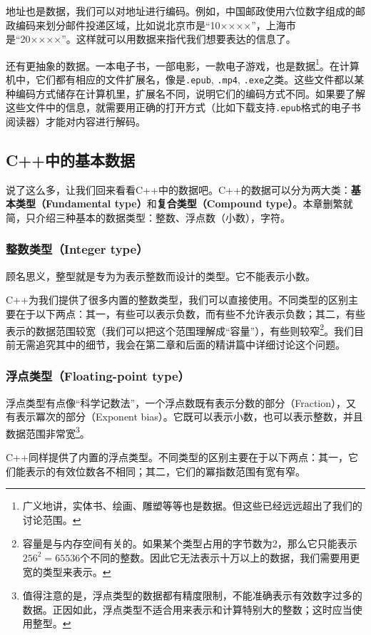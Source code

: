 地址也是数据，我们可以对地址进行编码。例如，中国邮政使用六位数字组成的邮政编码来划分邮件投递区域，比如说北京市是``10××××''，上海市是``20××××''。这样就可以用数据来指代我们想要表达的信息了。\par
还有更抽象的数据。一本电子书，一部电影，一款电子游戏，也是数据\footnote{广义地讲，实体书、绘画、雕塑等等也是数据。但这些已经远远超出了我们的讨论范围。}。在计算机中，它们都有相应的文件扩展名，像是\texttt{.epub}, \texttt{.mp4}, \texttt{.exe}之类。这些文件都以某种编码方式储存在计算机里，扩展名不同，说明它们的编码方式不同。如果要了解这些文件中的信息，就需要用正确的打开方式（比如下载支持\texttt{.epub}格式的电子书阅读器）才能对内容进行解码。\par
\subsection*{C++中的基本数据}
说了这么多，让我们回来看看C++中的数据吧。C++的数据可以分为两大类：\textbf{基本类型（Fundamental type）}和\textbf{复合类型（Compound type）}。本章删繁就简，只介绍三种基本的数据类型：整数、浮点数（小数），字符。\par
\subsubsection*{整数类型（Integer type）}
顾名思义，整型就是专为为表示整数而设计的类型。它不能表示小数。\par
C++为我们提供了很多内置的整数类型，我们可以直接使用。不同类型的区别主要在于以下两点：其一，有些可以表示负数，而有些不允许表示负数；其二，有些表示的数据范围较宽（我们可以把这个范围理解成``容量''），有些则较窄\footnote{容量是与内存空间有关的。如果某个类型占用的字节数为2，那么它只能表示$256^2=65536$个不同的整数。因此它无法表示十万以上的数据，我们需要用更宽的类型来表示。}。我们目前无需追究其中的细节，我会在第二章和后面的精讲篇中详细讨论这个问题。\par
\subsubsection*{浮点类型（Floating-point type）}
浮点类型有点像``科学记数法''，一个浮点数既有表示分数的部分（Fraction），又有表示冪次的部分（Exponent bias）。它既可以表示小数，也可以表示整数，并且数据范围非常宽\footnote{值得注意的是，浮点类型的数据都有精度限制，不能准确表示有效数字过多的数据。正因如此，浮点类型不适合用来表示和计算特别大的整数；这时应当使用整型。}。\par
C++同样提供了内置的浮点类型。不同类型的区别主要在于以下两点：其一，它们能表示的有效位数各不相同；其二，它们的冪指数范围有宽有窄。\par
